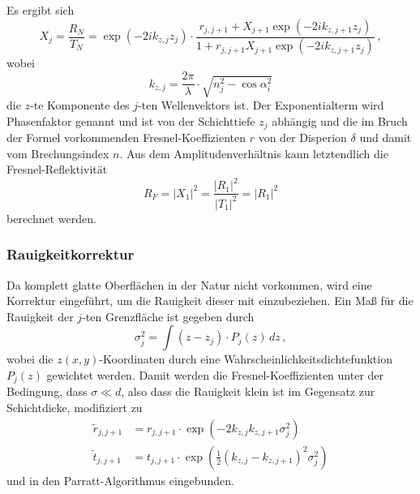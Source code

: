             Es ergibt sich
            \begin{equation}
                X_j=\frac{R_N}{T_N}=\exp\left(-2ik_{z,j}z_j\right)\cdot\frac{r_{j,j+1}+X_{j+1}\exp\left(-2ik_{z,j+1}z_j\right)}{1+r_{j,j+1}X_{j+1}\exp\left(-2ik_{z,j+1}z_j\right)} \, ,
                \label{eqn:X_j}
            \end{equation}
            wobei
            \begin{equation}
                k_{z,j}=\frac{2\pi}{\lambda}\cdot\sqrt{n_j^2-\cos\alpha_i^2}
                \label{eqn:k_z}
            \end{equation}
            die $z$-te Komponente des $j$-ten Wellenvektors ist.
            Der Exponentialterm wird Phasenfaktor genannt und ist von der Schichttiefe $z_j$ abhängig und
            die im Bruch der Formel vorkommenden Fresnel-Koeffizienten $r$ von der Disperion $\delta$ und damit vom Brechungsindex $n$.
            Aus dem Amplitudenverhältnis kann letztendlich die Fresnel-Reflektivität
            \begin{equation}
                R_F=\vert X_1\vert^2=\frac{\vert R_1\vert^2}{\vert T_1\vert^2}=\vert R_1\vert^2
                \label{eqn:R_F_parratt}
            \end{equation}
            berechnet werden.
        \subsubsection{Rauigkeitkorrektur}
            Da komplett glatte Oberflächen in der Natur nicht vorkommen, wird eine Korrektur eingeführt, um die Rauigkeit dieser mit einzubeziehen.
            Ein Maß für die Rauigkeit der $j$-ten Grenzfläche ist gegeben durch
            \begin{equation}
                \sigma_j^2=\int \left(z-z_j\right)\cdot P_j(z) \,dz \, ,
            \end{equation}
            wobei die $z(x,y)$-Koordinaten durch eine Wahrscheinlichkeitsdichtefunktion $P_j(z)$ gewichtet werden.
            Damit werden die Fresnel-Koeffizienten unter der Bedingung, dass $\sigma\ll d$,
            also dass die Rauigkeit klein ist im Gegensatz zur Schichtdicke, modifiziert zu
            \begin{align}
                \tilde{r}_{j,j+1}&=r_{j,j+1}\cdot\exp\left(-2k_{z,j}k_{z,j+1}\sigma_j^2\right) \\
                \tilde{t}_{j,j+1}&=t_{j,j+1}\cdot\exp\left(\frac{1}{2}\left(k_{z,j}-k_{z,j+1}\right)^2\sigma_j^2\right)
                \label{eqn:r_rau}
            \end{align}
            und in den Parratt-Algorithmus eingebunden.